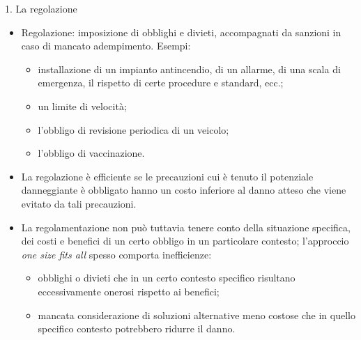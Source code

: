 \documentclass[aspectratio=64,11pt]{beamer}
\begin{document}
\begin{frame}{1. La regolazione}
\begin{itemize}
\item \alert{Regolazione}: imposizione di obblighi e divieti, accompagnati da sanzioni in
caso di mancato adempimento. Esempi:
\begin{itemize}
\item installazione di un impianto antincendio, di un allarme, di una scala di
emergenza, il rispetto di certe procedure e standard, ecc.;
\item un limite di velocità;
\item l’obbligo di revisione periodica di un veicolo;
\item l’obbligo di vaccinazione.
\end{itemize}
\item La regolazione è \alert{efficiente} se le precauzioni cui è tenuto il potenziale
danneggiante è obbligato hanno un costo inferiore al danno atteso che viene
evitato da tali precauzioni.
\item La regolamentazione non può tuttavia tenere conto della situazione
specifica, dei costi e benefici di un certo obbligo in un particolare
contesto; l'approccio \emph{one size fits all} spesso comporta inefficienze:
\begin{itemize}
\item obblighi o divieti che in un certo contesto specifico risultano
eccessivamente onerosi rispetto ai benefici;
\item mancata considerazione di soluzioni alternative meno costose che in quello
specifico contesto potrebbero ridurre il danno.
\end{itemize}
\end{itemize}
\end{frame}
\end{document}
